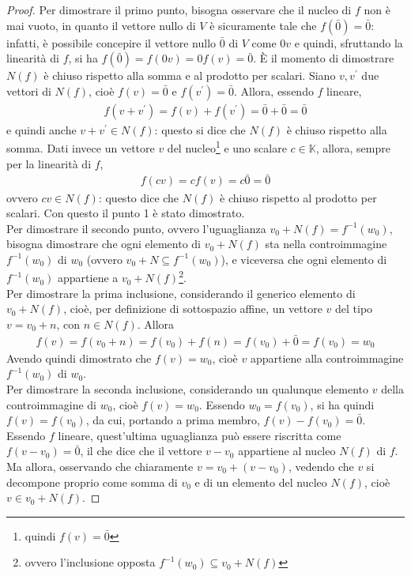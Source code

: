 \begin{proof}
  Per dimostrare il primo punto, bisogna osservare che il nucleo di $f$
  non è mai vuoto, in quanto il vettore nullo di $V$ è sicuramente tale
  che $f(\bar{0})=\bar{0}$: infatti, è possibile concepire il vettore
  nullo $\bar{0}$ di $V$ come $0v$ e quindi, sfruttando la linearità di
  $f$, si ha $f(\bar{0})=f(0v)=0f(v)=\bar{0}$.
  È il momento di dimostrare $N(f)$ è chiuso rispetto alla somma e al
  prodotto per scalari. Siano $v,v^\prime$ due vettori di $N(f)$, cioè
  $f(v)=\bar{0}$ e $f(v^\prime)=\bar{0}$. Allora, essendo $f$ lineare,
  \begin{eqnarray*}
    f(v+v^\prime)=f(v)+f(v^\prime)=\bar{0}+\bar{0}=\bar{0}
  \end{eqnarray*}
  e quindi anche $v+v^\prime\in N(f)$: questo si dice che $N(f)$ è chiuso
  rispetto alla somma. Dati invece un vettore $v$ del
  nucleo\footnote{quindi $f(v)=\bar{0}$} e uno scalare $c\in \mathds{K}$,
  allora, sempre per la linearità di $f$,
  \begin{eqnarray*}
    f(cv)=cf(v)=c\bar{0}=\bar{0}
  \end{eqnarray*}
  ovvero $cv\in N(f)$: questo dice che $N(f)$ è chiuso rispetto al
  prodotto per scalari. Con questo il punto 1 è stato dimostrato.\\
  Per dimostrare il secondo punto, ovvero l'uguaglianza $v_0+N(f)=
  f^{-1}(w_0)$, bisogna dimostrare che ogni elemento di $v_0+N(f)$ sta
  nella controimmagine $f^{-1}(w_0)$ di $w_0$ (ovvero $v_0+N\subseteq f^{-1}(w_0)$), e viceversa
  che ogni elemento di $f^{-1}(w_0)$ appartiene a $v_0+N(f)$\footnote{ovvero l'inclusione opposta
    $f^{-1}(w_0) \subseteq v_0+N(f)$}.\\
  Per dimostrare la prima inclusione, considerando il generico elemento di $v_0+N(f)$, cioè, per
  definizione di sottospazio affine, un vettore $v$ del tipo $v=v_0+n$, con $n\in N(f)$. Allora
  \begin{eqnarray*}
    f(v)=f(v_0+n)=f(v_0)+f(n)=f(v_0)+\bar{0}=f(v_0)=w_0
  \end{eqnarray*}
  Avendo quindi dimostrato che $f(v)=w_0$, cioè $v$ appartiene alla controimmagine $f^{-1}(w_0)$ di
  $w_0$. \\
  Per dimostrare la seconda inclusione, considerando un qualunque elemento $v$ della controimmagine
  di $w_0$, cioè $f(v)=w_0$. Essendo $w_0=f(v_0)$, si ha quindi $f(v)=f(v_0)$, da cui, portando a prima
  membro, $f(v)-f(v_0)=\bar{0}$. Essendo $f$ lineare, quest'ultima uguaglianza può essere riscritta
  come $f(v-v_0)=\bar{0}$, il che dice che il vettore $v-v_0$ appartiene al nucleo $N(f)$ di $f$.
  Ma allora, osservando che chiaramente $v=v_0+(v-v_0)$, vedendo che $v$ si decompone proprio come somma
  di $v_0$ e di un elemento del nucleo $N(f)$, cioè $v\in v_0+N(f)$.
\end{proof}

